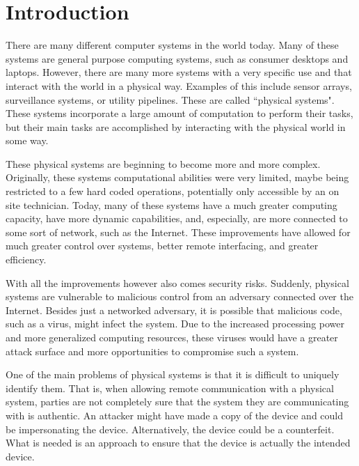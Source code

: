 %
%
%

\chapter{Introduction}
\label{chapter:intro}

There are many different computer systems in the world today. Many of these systems are general purpose computing
systems, such as consumer desktops and laptops. However, there are many more systems with a very specific use
and that interact with the world in a physical way. Examples of this include sensor arrays, surveillance systems,
or utility pipelines. These are called ``physical systems".
These systems incorporate a large amount of computation to perform their tasks, but their main tasks 
are accomplished
by interacting with the physical world in some way. 

These physical systems are beginning to become more and more complex. Originally, these systems computational
abilities were very limited, maybe being restricted to a few hard coded operations, potentially only accessible by
an on site technician. Today, many of these systems have a much greater computing capacity, have more
dynamic capabilities, and, especially, are more connected to some sort of network, such as the Internet.
These improvements have allowed for much greater control over systems, better remote interfacing, and greater
efficiency.

With all the improvements however also comes security risks. Suddenly, physical systems are vulnerable to malicious
control from an adversary connected over the Internet. Besides just a networked adversary, it is possible that
malicious code, such as a virus, might infect the system. Due to the increased processing power and more 
generalized computing resources, these viruses would have a greater attack surface and more opportunities to
compromise such a system.

One of the main problems of physical systems is that it is difficult to uniquely identify them. That is,
when allowing remote communication with a physical system, parties are not completely sure that the 
system they are communicating
with is authentic. An attacker might have made a copy of the device and could be impersonating the device. 
Alternatively, the device could be a counterfeit. 
What is needed is an approach to ensure that the device is actually the intended device.

